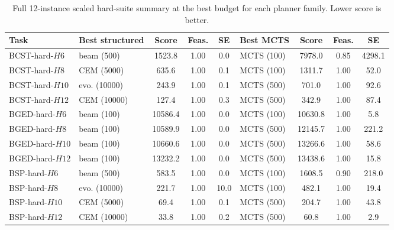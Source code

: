 \begin{table}[h]
\centering
\scriptsize
\caption{Full 12-instance scaled hard-suite summary at the best budget for each planner family. Lower score is better.}
\label{tab:scaled_full_best}
\begin{tabular}{l l c c c l c c c}
\toprule
Task & Best structured & Score & Feas. & SE & Best MCTS & Score & Feas. & SE \\
\midrule
\textsc{BCST}-hard-$H6$ & beam (500) & 1523.8 & 1.00 & 0.0 & MCTS (100) & 7978.0 & 0.85 & 4298.1 \\
\textsc{BCST}-hard-$H8$ & CEM (5000) & 635.6 & 1.00 & 0.1 & MCTS (100) & 1311.7 & 1.00 & 52.0 \\
\textsc{BCST}-hard-$H10$ & evo. (10000) & 243.9 & 1.00 & 0.1 & MCTS (500) & 701.0 & 1.00 & 92.6 \\
\textsc{BCST}-hard-$H12$ & CEM (10000) & 127.4 & 1.00 & 0.3 & MCTS (500) & 342.9 & 1.00 & 87.4 \\
\textsc{BGED}-hard-$H6$ & beam (100) & 10586.4 & 1.00 & 0.0 & MCTS (100) & 10630.8 & 1.00 & 5.8 \\
\textsc{BGED}-hard-$H8$ & beam (100) & 10589.9 & 1.00 & 0.0 & MCTS (500) & 12145.7 & 1.00 & 221.2 \\
\textsc{BGED}-hard-$H10$ & beam (100) & 10660.6 & 1.00 & 0.0 & MCTS (500) & 13266.6 & 1.00 & 58.6 \\
\textsc{BGED}-hard-$H12$ & beam (100) & 13232.2 & 1.00 & 0.0 & MCTS (500) & 13438.6 & 1.00 & 15.8 \\
\textsc{BSP}-hard-$H6$ & beam (500) & 583.5 & 1.00 & 0.0 & MCTS (100) & 1608.5 & 0.90 & 218.0 \\
\textsc{BSP}-hard-$H8$ & evo. (10000) & 221.7 & 1.00 & 10.0 & MCTS (100) & 482.1 & 1.00 & 19.4 \\
\textsc{BSP}-hard-$H10$ & CEM (5000) & 69.4 & 1.00 & 0.1 & MCTS (500) & 204.7 & 1.00 & 43.8 \\
\textsc{BSP}-hard-$H12$ & CEM (10000) & 33.8 & 1.00 & 0.2 & MCTS (500) & 60.8 & 1.00 & 2.9 \\
\bottomrule
\end{tabular}
\end{table}
